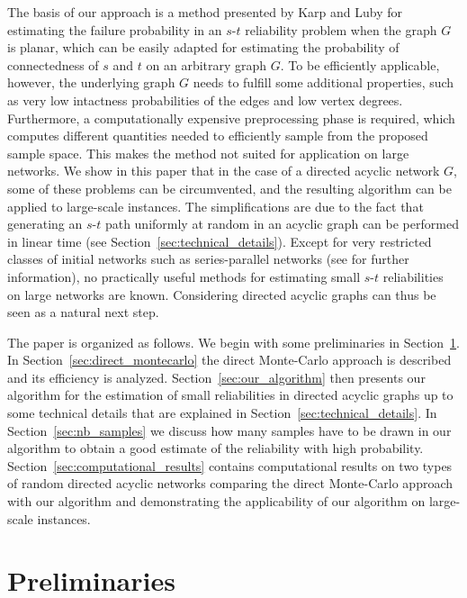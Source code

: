 \documentclass{article}
\begin{document}
The basis of our approach is a method presented by Karp and Luby
\cite{karp_1985_montecarlo} for estimating the
failure probability in an $s$-$t$ reliability problem when the
graph $G$ is planar, which can be easily adapted for estimating the
probability of connectedness of $s$ and $t$ on an arbitrary graph $G$.
To be efficiently applicable, however, the underlying graph $G$
needs to fulfill some additional properties, such as very low
intactness probabilities of the edges and low vertex degrees.
Furthermore, a computationally expensive preprocessing phase is
required, which computes different quantities needed to efficiently
sample from the proposed sample space. This makes the method not
suited for application on large networks. We show in
this paper that in the case of a directed acyclic network $G$,
some of these problems can be circumvented, and the resulting
algorithm can be applied to \mbox{large-scale} instances. The 
simplifications are due to the fact that generating
an $s$-$t$ path uniformly at random in an acyclic graph can be
performed in linear time (see Section~\ref{sec:technical_details}). Except for very restricted classes of initial networks such
as series-parallel
networks (see \cite{satyanarayana_1985_lineartime} for
further information), no practically useful methods for estimating small
$s$-$t$ reliabilities on large networks are known. Considering directed
acyclic graphs can thus be seen as a natural next step.

The paper is organized as follows. We begin with some
preliminaries in Section~\ref{sec:preliminaries}.
In Section~\ref{sec:direct_montecarlo} the
direct \mbox{Monte-Carlo} approach is described and
its efficiency is analyzed. Section~\ref{sec:our_algorithm}
then presents our algorithm for the estimation of small
reliabilities in directed acyclic graphs up to some technical details that
are explained in Section~\ref{sec:technical_details}. In
Section~\ref{sec:nb_samples} we discuss how many samples have
to be drawn in our algorithm to obtain a good estimate of
the reliability with high probability.
Section~\ref{sec:computational_results} contains
computational results on two types of random directed acyclic networks
comparing the direct \mbox{Monte-Carlo}
approach with our algorithm and demonstrating the applicability
of our algorithm on \mbox{large-scale} instances.

\section{Preliminaries}\label{sec:preliminaries}
\end{document}
